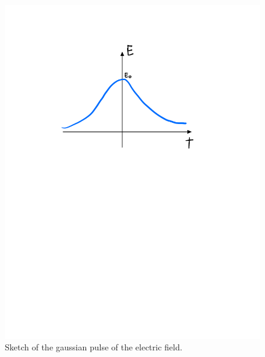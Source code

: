 \begin{figure}[htbp]
    \centering
    \includegraphics[scale=0.6]{Images/fig-gaussianpulse.pdf}
    \caption{Sketch of the gaussian pulse of the electric field.}
    \label{fig-gaussianpulse}
\end{figure}

